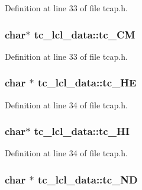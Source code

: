 Definition at line 33 of file tcap.\+h.

\hypertarget{structtc__lcl__data_a604d0cb40e952c24c693786401d758bb}{
\subsubsection[{tc\+\_\+\+C\+M}]{\setlength{\rightskip}{0pt plus 5cm}char$\ast$ tc\+\_\+lcl\+\_\+data\+::tc\+\_\+\+C\+M}}\label{structtc__lcl__data_a604d0cb40e952c24c693786401d758bb}


Definition at line 33 of file tcap.\+h.

\hypertarget{structtc__lcl__data_a08b9b8011f478ffd1747b9d7d5e6abc5}{
\subsubsection[{tc\+\_\+\+H\+E}]{\setlength{\rightskip}{0pt plus 5cm}char $\ast$ tc\+\_\+lcl\+\_\+data\+::tc\+\_\+\+H\+E}}\label{structtc__lcl__data_a08b9b8011f478ffd1747b9d7d5e6abc5}


Definition at line 34 of file tcap.\+h.

\hypertarget{structtc__lcl__data_a1b77b204bf10795f7f5c46f60a5a5824}{
\subsubsection[{tc\+\_\+\+H\+I}]{\setlength{\rightskip}{0pt plus 5cm}char$\ast$ tc\+\_\+lcl\+\_\+data\+::tc\+\_\+\+H\+I}}\label{structtc__lcl__data_a1b77b204bf10795f7f5c46f60a5a5824}


Definition at line 34 of file tcap.\+h.

\hypertarget{structtc__lcl__data_a2b28cdf4f1499b47767b9b3b15452e41}{
\subsubsection[{tc\+\_\+\+N\+D}]{\setlength{\rightskip}{0pt plus 5cm}char $\ast$ tc\+\_\+lcl\+\_\+data\+::tc\+\_\+\+N\+D}}\label{structtc__lcl__data_a2b28cdf4f1499b47767b9b3b15452e41}


